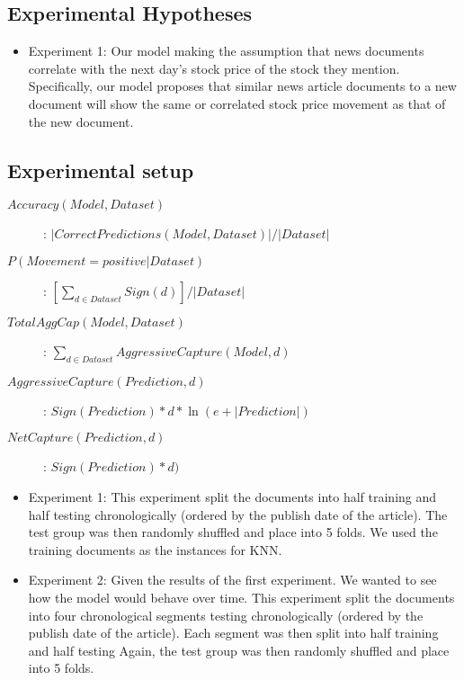 \documentclass[11pt,letterpaper]{article}
\newcommand{\blue}[1]{\textcolor{RoyalBlue}{#1}}
\newcommand{\instructions}[1]{\blue{\textit{#1}}}
\begin{document}
\subsection{Experimental Hypotheses}
\label{sec:exper-hypoth}
\begin{itemize}
  \item Experiment 1: Our model making the assumption that news documents
  correlate with the next day's stock price of the stock they mention.
  Specifically, our model proposes that similar news article documents to a new
  document will show the same or correlated stock price movement as that of the new document.
\end{itemize}

\subsection{Experimental setup}
\label{sec:experimental-setup}
\begin{description}
  \item[\(Accuracy(Model, Dataset)\)] : $|CorrectPredictions(Model, Dataset)| / |Dataset|$
  \item[\(P(Movement = positive | Dataset)\)] : $[\sum_{d \in Dataset} Sign(d)] / |Dataset|$
  \item[\(TotalAggCap(Model, Dataset)\)] : $\sum_{d \in Dataset} AggressiveCapture(Model, d) $
  \item[\(AggressiveCapture(Prediction, d)\)] : $Sign(Prediction) * d * \ln(e + |Prediction|)$
  \item[\(NetCapture(Prediction, d)\)] : $Sign(Prediction) * d)$
\end{description}

\begin{itemize}
  \item Experiment 1: This experiment split the documents into half training and half testing
  chronologically (ordered by the publish date of the article). The test group
  was then randomly shuffled and place into 5 folds. We used the training documents as the
  instances for KNN.
  \item Experiment 2: Given the results of the first experiment. We wanted to see
  how the model would behave over time. This experiment split the documents into
  four chronological segments testing chronologically (ordered by the publish
  date of the article). Each segment was then split into half training and half testing
  Again, the test group was then randomly shuffled and place into 5
  folds.
\end{itemize}
\end{document}
